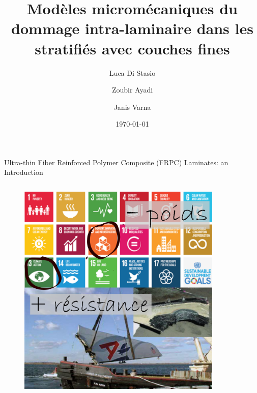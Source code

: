 \documentclass[final]{beamer}
\title{Mod\`eles microm\'ecaniques du dommage intra-laminaire dans les stratifi\'es avec couches fines}
\author{Luca Di Stasio \inst{1,2} \and Zoubir Ayadi \inst{1} \and Janis Varna \inst{2}}
\date{\today}
\begin{document}
\begin{frame}

\begin{center}
\begin{minipage}{\textwidth}
\begin{block}{\rule[-0.6ex]{0pt}{50pt}\centering\LARGE Ultra-thin Fiber Reinforced Polymer Composite (FRPC) Laminates: an Introduction}
\vspace{1cm}
\begin{columns}
\begin{column}{0.375\textwidth}
  \begin{center}
\captionsetup[subfigure]{labelformat=empty}
\begin{figure}[!h]
\centering
\includegraphics[width=0.9\columnwidth]{intro.pdf}
\end{figure}
\end{center}
\end{column}
\begin{column}{0.325\textwidth}  %
  \begin{center}
\captionsetup[subfigure]{labelformat=empty}
\begin{figure}[!h]
\centering

\end{figure}
\end{center}
\end{column}
\end{columns}
\end{block}
\end{minipage}
\end{center}
\end{frame}
\end{document}
